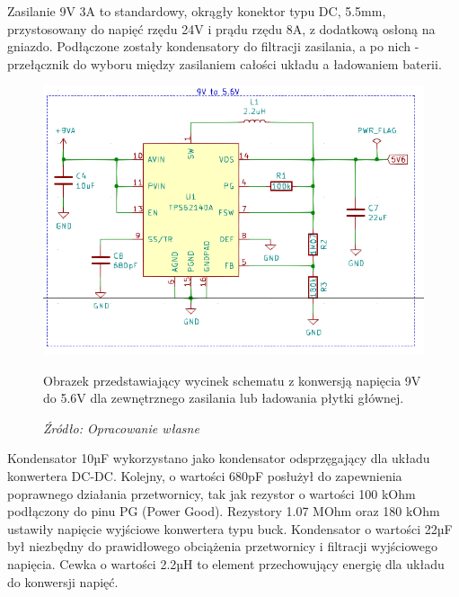 \documentclass[12pt,a4paper,oneside]{memoir}
\begin{document}
\par Zasilanie 9V 3A to standardowy, okrągły konektor typu DC, 5.5mm, przystosowany do napięć rzędu 24V i prądu rzędu 8A, z dodatkową osłoną na gniazdo. Podłączone zostały kondensatory do filtracji zasilania, a po nich - przełącznik do wyboru między zasilaniem całości układu a ładowaniem baterii.
\newpage
\begin{figure}[!h]
	\centering
	\includegraphics[scale=0.5]{images/sch/sch-03.png}
	{\tytulyrozdzialow \footnotesize \caption[Schemat - konwersja do 5.6V] {Obrazek przedstawiający wycinek schematu z konwersją napięcia 9V do 5.6V dla zewnętrznego zasilania lub ładowania płytki głównej.}}
	\caption*{\textit{Źródło: Opracowanie własne}}
\end{figure}
\par Kondensator 10µF wykorzystano jako kondensator odsprzęgający dla układu konwertera DC-DC. Kolejny, o wartości 680pF posłużył do zapewnienia poprawnego działania przetwornicy, tak jak rezystor o wartości 100 kOhm podłączony do pinu PG (Power Good). Rezystory 1.07 MOhm oraz 180 kOhm ustawiły napięcie wyjściowe konwertera typu buck. Kondensator o wartości 22µF był niezbędny do prawidłowego obciążenia przetwornicy i filtracji wyjściowego napięcia. Cewka o wartości 2.2µH to element przechowujący energię dla układu do konwersji napięć.
\newpage
\end{document}
